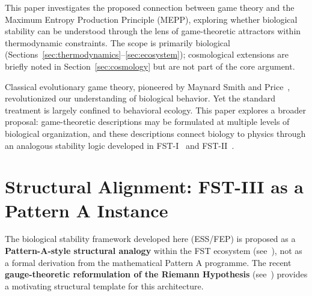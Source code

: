 \documentclass[12pt,a4paper]{article}
\theoremstyle{remark}
\begin{document}
This paper investigates the proposed connection between game theory and the Maximum Entropy Production Principle (MEPP), exploring whether biological stability can be understood through the lens of game-theoretic attractors within thermodynamic constraints. The scope is primarily biological (Sections~\ref{sec:thermodynamics}--\ref{sec:ecosystem}); cosmological extensions are briefly noted in Section~\ref{sec:cosmology} but are not part of the core argument.

Classical evolutionary game theory, pioneered by Maynard Smith and Price~\citep{MaynardSmithPrice1973,MaynardSmith1982}, revolutionized our understanding of biological behavior. Yet the standard treatment is largely confined to behavioral ecology. This paper explores a broader proposal: game-theoretic descriptions may be formulated at multiple levels of biological organization, and these descriptions connect biology to physics through an analogous stability logic developed in FST-I~\citep{FSTI} and FST-II~\citep{FSTII}.

\section{Structural Alignment: FST-III as a Pattern A Instance}
\label{sec:structural-alignment}

The biological stability framework developed here (ESS/FEP) is proposed as a \textbf{Pattern-A-style structural analogy} within the FST ecosystem (see~\cite{FST-Unified2026}), not as a formal derivation from the mathematical Pattern A programme. The recent \textbf{gauge-theoretic reformulation of the Riemann Hypothesis} (see~\cite{GeigerRH2026c}) provides a motivating structural template for this architecture.
\end{document}

